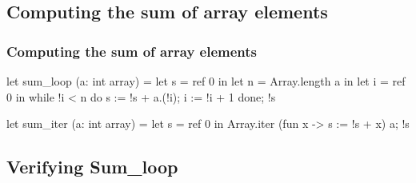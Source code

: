 \subsection*{Computing the sum of array elements}
\begin{frame}[fragile]\frametitle{Computing the sum of array elements}
\begin{adjustwidth}{-0.3cm}{1.0cm}
\begin{small}
\begin{minipage}[t]{0.4\textwidth}
\begin{whycode}  
let sum_loop (a: int array)
= let s = ref 0 in
  let n = Array.length a in
  let i = ref 0 in
  while !i < n do
    s := !s + a.(!i);
    i := !i + 1
  done;
  !s
\end{whycode}
\end{minipage}\hfill
\begin{minipage}[t]{0.4\textwidth}
\begin{whycode} 
let sum_iter (a: int array)
= let s = ref 0 in
  Array.iter 
    (fun x -> s := !s + x) a;
  !s
\end{whycode}	
\end{minipage}
\end{small}
\end{adjustwidth}
\end{frame}

\subsection*{Verifying Sum\_loop}
